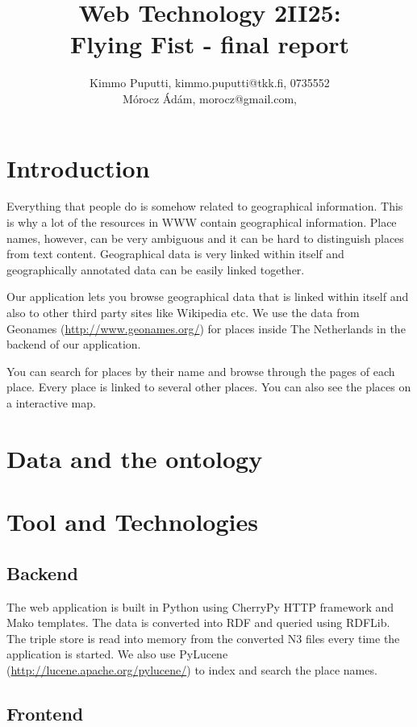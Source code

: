 \documentclass[a4paper,12pt]{article}
\title{Web Technology 2II25:\\Flying Fist - final report}
\author{Kimmo Puputti, kimmo.puputti@tkk.fi, 0735552\\M\'orocz \'Ad\'am, morocz@gmail.com, }
\begin{document}
\maketitle

\section{Introduction}

Everything that people do is somehow related to geographical
information. This is why a lot of the resources in WWW contain
geographical information. Place names, however, can be very ambiguous
and it can be hard to distinguish places from text
content. Geographical data is very linked within itself and
geographically annotated data can be easily linked together.

Our application lets you browse geographical data that is linked
within itself and also to other third party sites like Wikipedia
etc. We use the data from Geonames (\url{http://www.geonames.org/})
for places inside The Netherlands in the backend of our application.

You can search for places by their name and browse through the pages
of each place. Every place is linked to several other places. You can
also see the places on a interactive map.

\section{Data and the ontology}



\section{Tool and Technologies}

\subsection{Backend}

The web application is built in Python using CherryPy HTTP framework
and Mako templates. The data is converted into RDF and queried using
RDFLib. The triple store is read into memory from the converted N3
files every time the application is started. We also use PyLucene
(\url{http://lucene.apache.org/pylucene/}) to index and search the
place names.

\subsection{Frontend}
\end{document}
